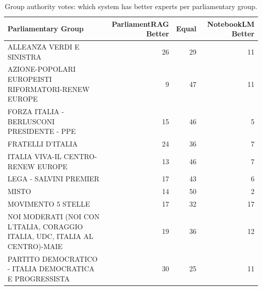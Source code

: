 \begin{table}[htbp]
\centering
\caption{Group authority votes: which system has better experts per parliamentary group.}
\label{tab:group_authority}
\small
\begin{tabular}{lrrr}
\toprule
Parliamentary Group & ParliamentRAG Better & Equal & NotebookLM Better \\
\midrule
ALLEANZA VERDI E SINISTRA & 26 & 29 & 11 \\
AZIONE-POPOLARI EUROPEISTI RIFORMATORI-RENEW EUROPE & 9 & 47 & 11 \\
FORZA ITALIA - BERLUSCONI PRESIDENTE - PPE & 15 & 46 & 5 \\
FRATELLI D'ITALIA & 24 & 36 & 7 \\
ITALIA VIVA-IL CENTRO-RENEW EUROPE & 13 & 46 & 7 \\
LEGA - SALVINI PREMIER & 17 & 43 & 6 \\
MISTO & 14 & 50 & 2 \\
MOVIMENTO 5 STELLE & 17 & 32 & 17 \\
NOI MODERATI (NOI CON L'ITALIA, CORAGGIO ITALIA, UDC, ITALIA AL CENTRO)-MAIE & 19 & 36 & 12 \\
PARTITO DEMOCRATICO - ITALIA DEMOCRATICA E PROGRESSISTA & 30 & 25 & 11 \\
\bottomrule
\end{tabular}
\end{table}